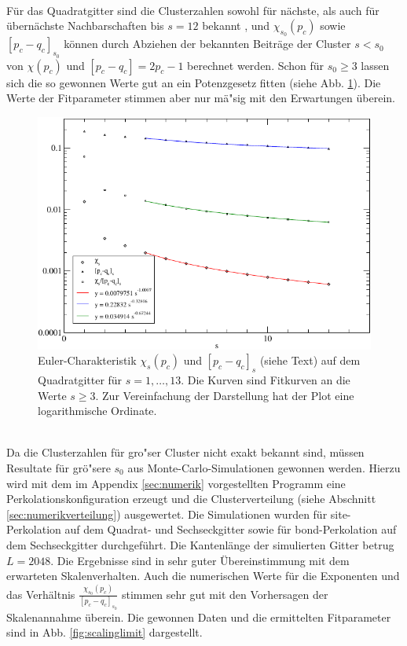 \\F\"ur das Quadratgitter sind die Clusterzahlen sowohl f\"ur n\"achste, als auch f\"ur \"ubern\"achste Nachbarschaften bis $s=12$ bekannt \cite{Mertens:90}, und $\chi_{s_0}(p_c)$ sowie $[p_c-q_c]_{s_0}$ k\"onnen durch Abziehen der bekannten Beitr\"age der Cluster $s<s_0$ von $\chi(p_c)$ und $[p_c-q_c]=2p_c-1$ berechnet werden. Schon f\"ur $s_0\geq 3$ lassen sich die so gewonnen Werte gut an ein Potenzgesetz fitten (siehe Abb. \ref{fig:analytisch_pc_fig}). Die Werte der Fitparameter stimmen aber nur m\"a"sig mit den Erwartungen \"uberein.
\begin{figure}[tbp]
  \centering
  \includegraphics{./Schranken-figs/analytisch_pc_fig}
  \caption{Euler-Charakteristik $\chi_s(p_c)$ und $[p_c-q_c]_s$ (siehe Text) auf dem Quadratgitter f\"ur $s=1,\ldots,13$. Die Kurven sind Fitkurven an die Werte $s\geq3$. Zur Vereinfachung der Darstellung hat der Plot eine logarithmische Ordinate.}
  \label{fig:analytisch_pc_fig}
\end{figure}
\\Da die Clusterzahlen f\"ur gro"ser Cluster nicht exakt bekannt sind, m\"ussen Resultate f\"ur gr\"o"sere $s_0$ aus Monte-Carlo-Simulationen gewonnen werden. Hierzu wird mit dem im Appendix \ref{sec:numerik} vorgestellten Programm eine Perkolationskonfiguration erzeugt und die Clusterverteilung (siehe Abschnitt \ref{sec:numerikverteilung}) ausgewertet. Die Simulationen wurden f\"ur site-Perkolation auf dem Quadrat- und Sechseckgitter sowie f\"ur bond-Perkolation auf dem Sechseckgitter durchgef\"uhrt. Die Kantenl\"ange der simulierten Gitter betrug $L=2048$. Die Ergebnisse sind in sehr guter \"Ubereinstimmung mit dem erwarteten Skalenverhalten. Auch die numerischen Werte f\"ur die Exponenten und das Verh\"altnis $\frac{\chi_{s_0}(p_c)}{[p_c-q_c]_{s_0}}$ stimmen sehr gut mit den Vorhersagen der Skalenannahme \"uberein. Die gewonnen Daten und die ermittelten Fitparameter sind in Abb. \ref{fig:scalinglimit} dargestellt.\\
